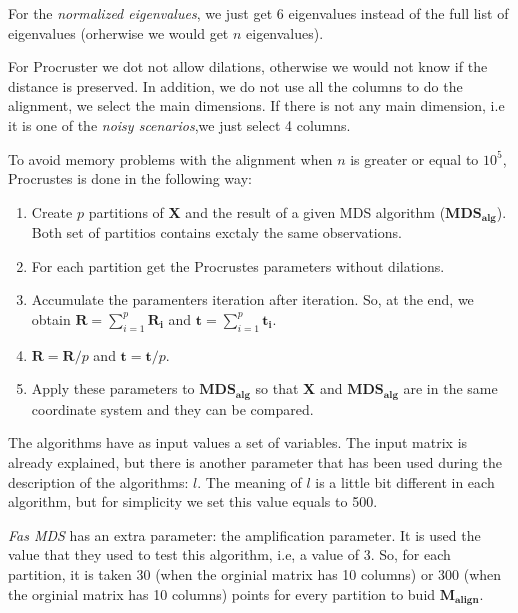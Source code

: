 \documentclass[11pt]{report}
\begin{document}
\indent For the \textit{normalized eigenvalues}, we just get 6 eigenvalues 
instead of the full list of eigenvalues (orherwise we would get $n$ 
eigenvalues). 

\indent For Procruster we dot not allow dilations, otherwise we would not
know if the distance is preserved. In addition, we do not use all the columns 
to do the alignment, we select the main dimensions. If there is not any
main dimension, i.e it is one of the \textit{noisy scenarios},we just select 4 
columns. 

\indent To avoid memory problems with the alignment when $n$ is greater or 
equal to $10^5$, Procrustes is done in the following way:

\begin{enumerate}

\item Create $p$ partitions of \textbf{X} and the result of a given MDS 
algorithm ($\mathbf{MDS_{alg}}$). Both set of partitios contains exctaly the
same observations.


\item For each partition get the Procrustes parameters without dilations.

\item Accumulate the paramenters iteration after iteration. So, at the end, 
we obtain $\mathbf{R} = \sum_{i = 1}^p \mathbf{R_i}$ and 
$\mathbf{t} = \sum_{i = 1}^p \mathbf{t_i}$.

\item $\mathbf{R} = \mathbf{R}/p$ and $\mathbf{t} = \mathbf{t}/p$.

\item Apply these parameters to $\mathbf{MDS_{alg}}$ so that 
\textbf{X} and $\mathbf{MDS_{alg}}$ are in the same coordinate system and
they can be compared.


\end{enumerate}

\indent The algorithms have as input values a set of variables. The input matrix 
is already explained, but there is another parameter that has been used during 
the description of the algorithms: $l$. The meaning of $l$ is a little bit 
different in each algorithm, but for simplicity we set this value
equals to 500.

\indent \textit{Fas MDS} has an extra parameter: the amplification parameter.
It is used the value that they used to test this algorithm, i.e, a value of
3. So, for each partition, it is taken 30 (when the orginial matrix
has 10 columns) or 300 (when the orginial matrix has 10 columns) points for
every partition to buid $\mathbf{M_{align}}$.
\end{document}
